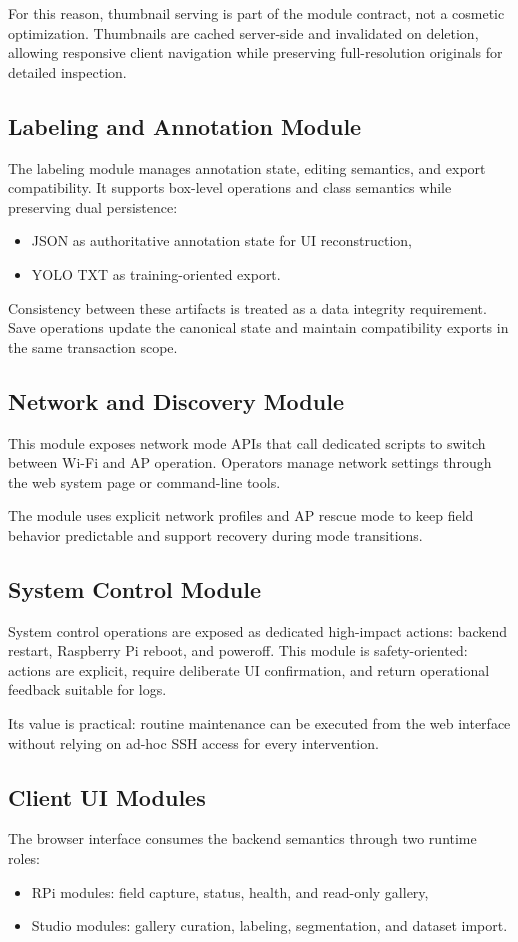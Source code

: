 For this reason, thumbnail serving is part of the module contract, not a cosmetic optimization. Thumbnails are cached server-side and invalidated on deletion, allowing responsive client navigation while preserving full-resolution originals for detailed inspection.

\subsection{Labeling and Annotation Module}
The labeling module manages annotation state, editing semantics, and export compatibility. It supports box-level operations and class semantics while preserving dual persistence:
\begin{itemize}
  \item JSON as authoritative annotation state for UI reconstruction,
  \item YOLO TXT as training-oriented export.
\end{itemize}

Consistency between these artifacts is treated as a data integrity requirement. Save operations update the canonical state and maintain compatibility exports in the same transaction scope.

\subsection{Network and Discovery Module}
This module exposes network mode APIs that call dedicated scripts to switch between Wi-Fi and AP operation. Operators manage network settings through the web system page or command-line tools.

The module uses explicit network profiles and AP rescue mode to keep field behavior predictable and support recovery during mode transitions.

\subsection{System Control Module}
System control operations are exposed as dedicated high-impact actions: backend restart, Raspberry Pi reboot, and poweroff. This module is safety-oriented: actions are explicit, require deliberate UI confirmation, and return operational feedback suitable for logs.

Its value is practical: routine maintenance can be executed from the web interface without relying on ad-hoc SSH access for every intervention.

\subsection{Client UI Modules}
The browser interface consumes the backend semantics through two runtime roles:
\begin{itemize}
  \item RPi modules: field capture, status, health, and read-only gallery,
  \item Studio modules: gallery curation, labeling, segmentation, and dataset import.
\end{itemize}

